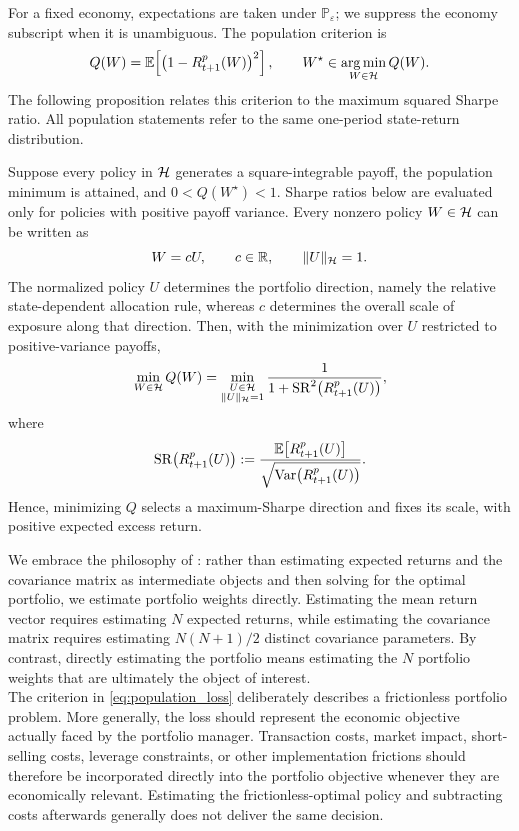 For a fixed economy, expectations are taken under $\mathbb P_\varepsilon$;
we suppress the economy subscript when it is unambiguous. The population
criterion is
\begin{equation}
Q(W)
=
\mathbb{E}\!\left[
\left(
1-R^p_{t+1}(W)
\right)^2
\right],
\qquad
W^\star\in\operatorname*{arg\,min}_{W\in\mathcal{H}}Q(W).
\label{eq:population_loss}
\end{equation}
The following proposition relates this criterion to the maximum squared
Sharpe ratio. All population statements refer to the same one-period
state-return distribution.
\begin{proposition}
\label{prop:population_optimal_policy}
Suppose every policy in $\mathcal{H}$ generates a square-integrable payoff, the
population minimum is attained, and $0<Q(W^\star)<1$.
Sharpe ratios below are evaluated only for policies with positive payoff
variance. Every nonzero policy $W\in\mathcal{H}$ can be written as
\[
W=cU,
\qquad
c\in\mathbb R,
\qquad
\|U\|_{\mathcal{H}}=1.
\]
The normalized policy $U$ determines the portfolio direction, namely the
relative state-dependent allocation rule, whereas $c$ determines the overall
scale of exposure along that direction.
Then, with the minimization over $U$ restricted to positive-variance payoffs,
\[
\min_{W\in\mathcal{H}} Q(W)
=
\min_{\substack{U\in\mathcal{H}\\ \|U\|_{\mathcal{H}}=1}}
\frac{1}{
1+\operatorname{SR}^2\!\left(R^p_{t+1}(U)\right)
},
\]
where
\[
\operatorname{SR}\!\left(R^p_{t+1}(U)\right)
:=
\frac{
\mathbb{E}\!\left[R^p_{t+1}(U)\right]
}{
\sqrt{
\operatorname{Var}\!\left(R^p_{t+1}(U)\right)
}
}.
\]
Hence, minimizing $Q$ selects a maximum-Sharpe direction and fixes its
scale, with positive expected excess return.

\end{proposition}



We embrace the philosophy of \citet{brandt1999}: rather than estimating expected returns and the covariance matrix as intermediate objects and then solving for the optimal portfolio, we estimate portfolio weights directly. Estimating the mean return vector requires estimating $N$ expected returns, while estimating the covariance matrix requires estimating $N(N+1)/2$ distinct covariance parameters. By contrast, directly estimating the portfolio means estimating the $N$ portfolio weights that are ultimately the object of interest.\\
The criterion in \eqref{eq:population_loss} deliberately describes a
frictionless portfolio problem. More generally, the loss should represent the
economic objective actually faced by the portfolio manager. Transaction costs,
market impact, short-selling costs, leverage constraints, or other
implementation frictions should therefore be incorporated directly into the
portfolio objective whenever they are economically relevant. Estimating the frictionless-optimal policy
and subtracting costs afterwards generally does not deliver the same decision.

